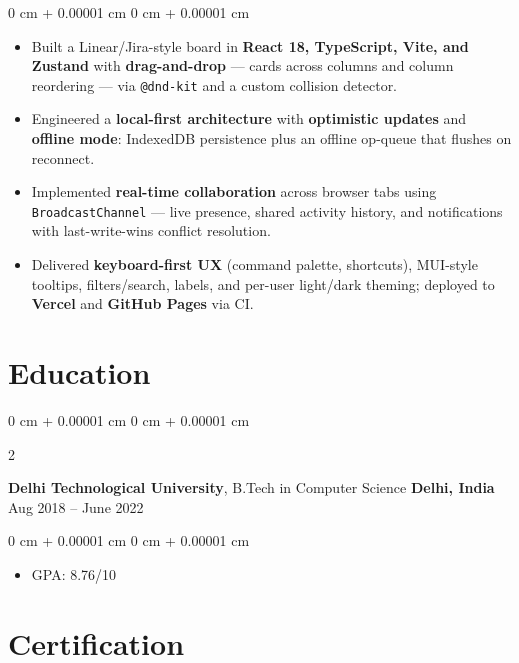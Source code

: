 \documentclass[10pt, letterpaper]{article}
\newenvironment{highlights}{
    \begin{itemize}[
        topsep=0.10 cm,
        parsep=0.10 cm,
        partopsep=0pt,
        itemsep=0pt,
        leftmargin=0 cm + 10pt
    ]
}{
    \end{itemize}
} %
\newenvironment{onecolentry}{
    \begin{adjustwidth}{
        0 cm + 0.00001 cm
    }{
        0 cm + 0.00001 cm
    }
}{
    \end{adjustwidth}
} %
\newenvironment{twocolentry}[2][]{
    \onecolentry
    \def\secondColumn{#2}
    \setcolumnwidth{\fill, 4.5 cm}
    \begin{paracol}{2}
}{
    \switchcolumn \raggedleft \secondColumn
    \end{paracol}
    \endonecolentry
} %
\begin{document}
        \vspace{0.10 cm}
        \begin{onecolentry}
            \begin{highlights}
    \item Built a Linear/Jira-style board in \textbf{React 18, TypeScript, Vite, and Zustand} with \textbf{drag-and-drop} — cards across columns and column reordering — via \texttt{@dnd-kit} and a custom collision detector.

    \item Engineered a \textbf{local-first architecture} with \textbf{optimistic updates} and \textbf{offline mode}: IndexedDB persistence plus an offline op-queue that flushes on reconnect.

    \item Implemented \textbf{real-time collaboration} across browser tabs using \texttt{BroadcastChannel} — live presence, shared activity history, and notifications with last-write-wins conflict resolution.

    \item Delivered \textbf{keyboard-first UX} (command palette, shortcuts), MUI-style tooltips, filters/search, labels, and per-user light/dark theming; deployed to \textbf{Vercel} and \textbf{GitHub Pages} via CI.

            \end{highlights}
        \end{onecolentry}


    \section{Education}



        \begin{twocolentry}{
            Aug 2018 – June 2022
        }
            \textbf{Delhi Technological University}, B.Tech in Computer Science \textbf{Delhi, India}\end{twocolentry}

        \vspace{0.10 cm}
        \begin{onecolentry}
            \begin{highlights}
                \item GPA: 8.76/10
            \end{highlights}
        \end{onecolentry}


 \section{Certification}
\end{document}
